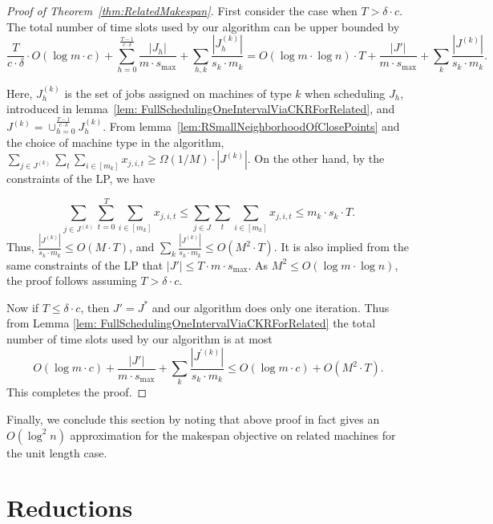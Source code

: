  \begin{proof}[Proof of Theorem~\ref{thm:RelatedMakespan}]
      
  First consider the case when $T > \delta \cdot c$. The total number of time slots used by our algorithm can be upper bounded by
  \[
  \frac{T}{c \cdot \delta} \cdot O(\log m \cdot c)  +\sum^{\frac{T-1}{c \cdot \delta}}_{h = 0} \frac{|J_h|}{m\cdot s_{\max}} + \sum_{h,k} \frac{|J_{h}^{(k)}|}{s_k \cdot m_k}=O(\log m \cdot \log n)  \cdot T  +  \frac{|J'|}{m\cdot s_{\max}}+\sum_{k}\frac{|J^{(k)}|}{s_k \cdot m_k}.
  \]
  
  Here, $J_h^{(k)}$ is the set of jobs assigned on machines of type $k$ when scheduling $J_h$, introduced in lemma~\ref{lem: FullSchedulingOneIntervalViaCKRForRelated}, and $J^{(k)} = \cup_{h=0}^{\frac{T-1}{c \cdot \delta}} J_h^{(k)}$. From lemma~\ref{lem:RSmallNeighborhoodOfClosePoints} and the choice of machine type in the algorithm, 
  $\sum_{j \in J^{(k)}} \sum_{t} \sum_{i \in [m_k]} x_{j,i,t} \geq \Omega(1/M) \cdot |J^{(k)}|$. On the other hand, by the constraints of the LP, we have
  
  \[
  \sum_{j \in J^{(k)}} \sum^{T}_{t = 0} \sum_{i \in [m_k]} x_{j,i,t} \le \sum_{j \in J} \sum_{t} \sum_{i \in [m_k]} x_{j,i,t} \le m_k \cdot s_k \cdot T.
  \]
  Thus, $\frac{|J^{(k)}|}{s_k \cdot m_k }\le O(M \cdot T)$, and $\sum_{k}\frac{|J^{(k)}|}{s_k \cdot m_k} \leq O(M^2 \cdot T)$.
  It is also implied from the same constraints of the LP that $|J'| \leq T \cdot m \cdot s_{\max}$.
  As $M^2 \leq O(\log m \cdot \log n)$,  the proof follows assuming $T > \delta \cdot c$.
  
  Now if $T \leq \delta \cdot c$, then $J' = J^*$ and our algorithm does only one iteration. Thus from  Lemma \ref{lem: FullSchedulingOneIntervalViaCKRForRelated}
  the total number of time slots used by our algorithm is at most
  $$
  O(\log m \cdot c ) + \frac{|J'|}{m\cdot s_{\max}}+\sum_k \frac{|J^{'(k)}|}{s_k \cdot m_k} \leq O(\log m \cdot c )  + O(M^2 \cdot T).
  $$ 
  This completes the proof.
  \end{proof}
  
  Finally, we conclude this section by noting that above proof in fact gives an $O(\log^2 n)$ approximation for the makespan objective on related machines for the unit length case.
  
  
  
  \section{Reductions}
  \label{sec:reduction2}
  
